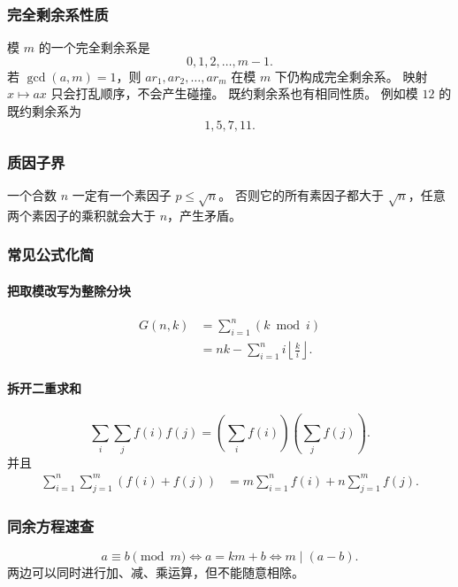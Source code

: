 \subsubsection{完全剩余系性质}

模 $m$ 的一个完全剩余系是
\[
  0,1,2,\ldots,m-1.
\]
若 $\gcd(a,m)=1$，则 $ar_1,ar_2,\ldots,ar_m$ 在模 $m$ 下仍构成完全剩余系。
映射 $x\mapsto ax$ 只会打乱顺序，不会产生碰撞。
既约剩余系也有相同性质。
例如模 $12$ 的既约剩余系为
\[
  1,5,7,11.
\]

\subsubsection{质因子界}

一个合数 $n$ 一定有一个素因子 $p\le\sqrt n$。
否则它的所有素因子都大于 $\sqrt n$，任意两个素因子的乘积就会大于 $n$，产生矛盾。

\subsubsection{常见公式化简}

\paragraph{把取模改写为整除分块}

\[
  \begin{aligned}
  G(n,k)
  &=\sum_{i=1}^{n}(k\bmod i)\\
  &=nk-\sum_{i=1}^{n}i\left\lfloor\frac ki\right\rfloor.
  \end{aligned}
\]

\paragraph{拆开二重求和}

\[
  \sum_i\sum_j f(i)f(j)
  =\left(\sum_i f(i)\right)\left(\sum_j f(j)\right).
\]
并且
\[
  \begin{aligned}
  \sum_{i=1}^{n}\sum_{j=1}^{m}(f(i)+f(j))
  &=m\sum_{i=1}^{n}f(i)+n\sum_{j=1}^{m}f(j).
  \end{aligned}
\]

\subsubsection{同余方程速查}

\[
  a\equiv b\pmod m
  \iff a=km+b
  \iff m\mid(a-b).
\]
两边可以同时进行加、减、乘运算，但不能随意相除。

